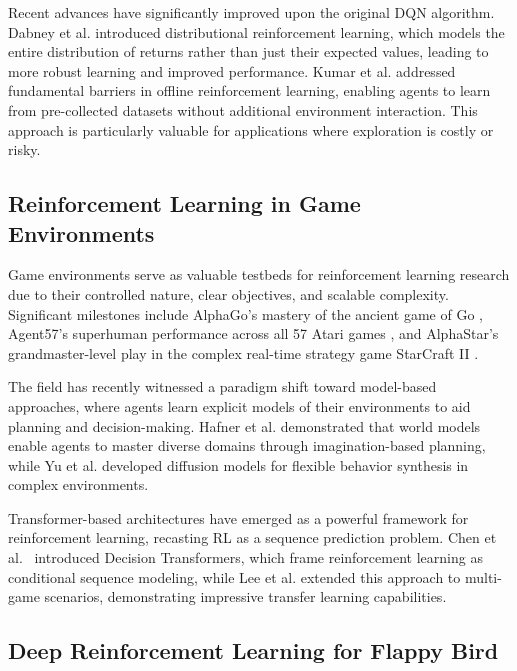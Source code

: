 Recent advances have significantly improved upon the original DQN algorithm. Dabney et al. \cite{dabney2020distributional} introduced distributional reinforcement learning, which models the entire distribution of returns rather than just their expected values, leading to more robust learning and improved performance. Kumar et al. \cite{kumar2023offline} addressed fundamental barriers in offline reinforcement learning, enabling agents to learn from pre-collected datasets without additional environment interaction. This approach is particularly valuable for applications where exploration is costly or risky.

\subsection{Reinforcement Learning in Game Environments}

Game environments serve as valuable testbeds for reinforcement learning research due to their controlled nature, clear objectives, and scalable complexity. Significant milestones include AlphaGo's mastery of the ancient game of Go \cite{silver2017mastering}, Agent57's superhuman performance across all 57 Atari games \cite{badia2020agent57}, and AlphaStar's grandmaster-level play in the complex real-time strategy game StarCraft II \cite{vinyals2019grandmaster}.

The field has recently witnessed a paradigm shift toward model-based approaches, where agents learn explicit models of their environments to aid planning and decision-making. Hafner et al. \cite{hafner2023mastering} demonstrated that world models enable agents to master diverse domains through imagination-based planning, while Yu et al. \cite{yu2022planning} developed diffusion models for flexible behavior synthesis in complex environments.

Transformer-based architectures have emerged as a powerful framework for reinforcement learning, recasting RL as a sequence prediction problem. Chen et al.~\cite{chen2021decision} introduced Decision Transformers, which frame reinforcement learning as conditional sequence modeling, while Lee et al. \cite{lee2022multi} extended this approach to multi-game scenarios, demonstrating impressive transfer learning capabilities.

\subsection{Deep Reinforcement Learning for Flappy Bird}

